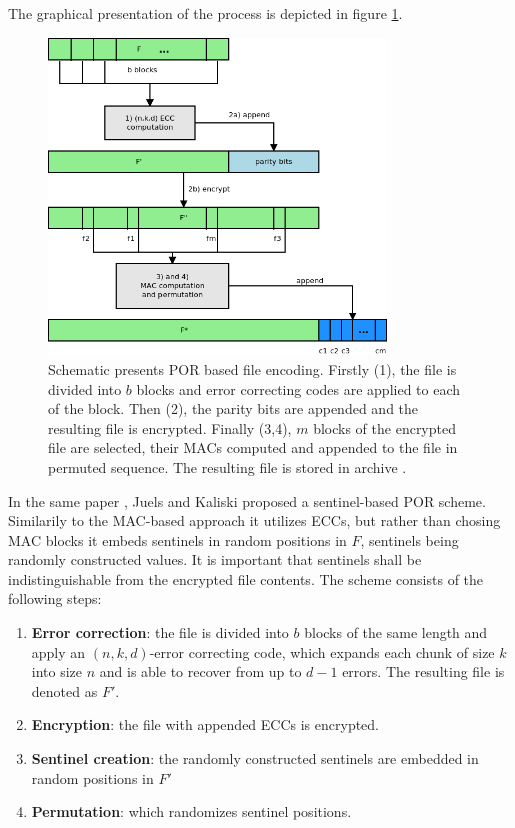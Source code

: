 The graphical presentation of the process is depicted in figure \ref{fig:por-modified-file}.\\

\begin{figure}[h!]
	\centering
	\includegraphics[width=0.8\textwidth]{images/por-schematic.png}
	\caption{Schematic presents POR based file encoding. Firstly (1), the file is divided into
	$b$ blocks and error correcting codes are applied to each of the block. Then (2), the
	parity bits are appended and the resulting file is encrypted. Finally (3,4), $m$ blocks of the encrypted
	file are selected, their MACs computed and appended to the file in permuted sequence. The resulting
	file is stored in archive \cite{por}.}
	\label{fig:por-modified-file}
\end{figure}

In the same paper \cite{por}, Juels and Kaliski proposed a sentinel-based POR
scheme. Similarily to the MAC-based approach it utilizes ECCs, but rather than
chosing MAC blocks it embeds sentinels in random positions in $F$, sentinels
being randomly constructed values. It is important that sentinels shall be 
indistinguishable from the encrypted file contents. The scheme consists of the
following steps:

\begin{enumerate}
	\item \textbf{Error correction}: the file is divided into $b$ blocks of the
	same length and apply an $(n,k,d)$-error correcting code,
	which expands each chunk of size $k$ into size $n$ and is able to recover
	from up to $d-1$ errors. The resulting file is denoted as $F'$.
	\item \textbf{Encryption}: the file with appended ECCs is encrypted.
	\item \textbf{Sentinel creation}: the randomly constructed sentinels are
	embedded in random positions in $F'$
	\item \textbf{Permutation}: which randomizes sentinel positions.
\end{enumerate}

